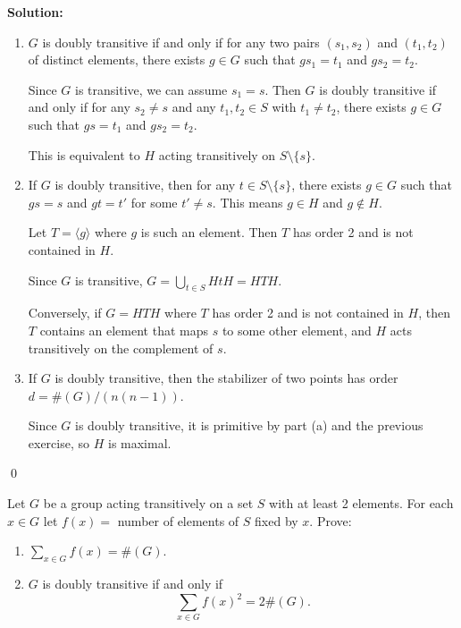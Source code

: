 \noindent\textbf{Solution:}
\begin{enumerate}[label=(\alph*)]
\item $G$ is doubly transitive if and only if for any two pairs $(s_1, s_2)$ and $(t_1, t_2)$ of distinct elements, there exists $g \in G$ such that $gs_1 = t_1$ and $gs_2 = t_2$.

Since $G$ is transitive, we can assume $s_1 = s$. Then $G$ is doubly transitive if and only if for any $s_2 \neq s$ and any $t_1, t_2 \in S$ with $t_1 \neq t_2$, there exists $g \in G$ such that $gs = t_1$ and $gs_2 = t_2$.

This is equivalent to $H$ acting transitively on $S \setminus \{s\}$.

\item If $G$ is doubly transitive, then for any $t \in S \setminus \{s\}$, there exists $g \in G$ such that $gs = s$ and $gt = t'$ for some $t' \neq s$. This means $g \in H$ and $g \notin H$.

Let $T = \langle g \rangle$ where $g$ is such an element. Then $T$ has order 2 and is not contained in $H$.

Since $G$ is transitive, $G = \bigcup_{t \in S} HtH = HTH$.

Conversely, if $G = HTH$ where $T$ has order 2 and is not contained in $H$, then $T$ contains an element that maps $s$ to some other element, and $H$ acts transitively on the complement of $s$.

\item If $G$ is doubly transitive, then the stabilizer of two points has order $d = \#(G)/(n(n-1))$.

Since $G$ is doubly transitive, it is primitive by part (a) and the previous exercise, so $H$ is maximal.
\end{enumerate}


\qed
\begin{problembox}
Let $G$ be a group acting transitively on a set $S$ with at least 2 elements. For each $x \in G$ let $f(x) = $ number of elements of $S$ fixed by $x$. Prove:
\begin{enumerate}[label=(\alph*)]
\item $\sum_{x \in G} f(x) = \#(G).$
\item $G$ is doubly transitive if and only if
\[\sum_{x \in G} f(x)^2 = 2 \#(G).\]
\end{enumerate}
\end{problembox}

